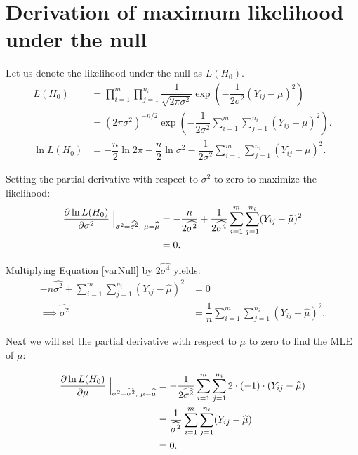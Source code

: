 \documentclass[12pt,a4paper,openright]{article}
\newcommand{\eqn}[1]{Equation \ref{#1}}
\newcommand{\wmu}{\widehat{\mu}}
\newcommand{\wst}{\widehat{\sigma^2}}
\begin{document}
	\section{Derivation of maximum likelihood under the null}
	Let us denote the likelihood under the null as $L(H_0)$. 
	\begin{align}
		L(H_0) &= \prod_{i=1}^m \prod_{j=1}^{n_i} \dfrac{1}{\sqrt{2\pi \sigma^2}} \exp{\left(-\dfrac{1}{2\sigma^2} (Y_{ij}-\mu)^2\right)} \nonumber\\
		&= (2\pi \sigma^2)^{-n/2}\exp{\left(-\dfrac{1}{2\sigma^2} \sum_{i=1}^m \sum_{j=1}^{n_i} (Y_{ij}-\mu)^2\right)}. \label{LH0}\\
		\ln{L(H_0)} &= -\dfrac{n}{2} \ln{2\pi} - \dfrac{n}{2}\ln{\sigma^2} - \dfrac{1}{2\sigma^2} \sum_{i=1}^m \sum_{j=1}^{n_i} (Y_{ij}-\mu)^2. \nonumber
	\end{align}

	Setting the partial derivative with respect to $\sigma^2$ to zero to maximize the likelihood:
	\begin{align}
		\dfrac{\partial \ln{L(H_0)}}{\partial \sigma^2} \Bigm\lvert_{\sigma^2=\wst, \hspace{0.1cm}\mu = \wmu} &= -\dfrac{n}{2\wst} + \dfrac{1}{2\widehat{\sigma^4}}\sum_{i=1}^m \sum_{j=1}^{n_i} (Y_{ij}-\wmu)^2 \nonumber\\
		&= 0. \label{varNull}
	\end{align}

	Multiplying \eqn{varNull} by $2\widehat{\sigma^4}$ yields:
	\begin{align}
		-n\wst + \sum_{i=1}^m \sum_{j=1}^{n_i} (Y_{ij}-\wmu)^2 &= 0\nonumber\\
		\implies \wst &= \dfrac{1}{n} \sum_{i=1}^m \sum_{j=1}^{n_i} (Y_{ij}-\hat{\mu})^2. \label{wst0}
	\end{align}

	Next we will set the partial derivative with respect to $\mu$ to zero to find the MLE of $\mu$:
	
	\begin{align}
		\dfrac{\partial \ln{L(H_0)}}{\partial \mu} \Bigm\lvert_{\sigma^2 = \wst, \hspace{0.1cm}\mu=\wmu} &= -\dfrac{1}{2\wst} \sum_{i=1}^m \sum_{j=1}^{n_i} 2\cdot (-1)\cdot (Y_{ij}-\wmu) \nonumber\\
		&= \dfrac{1}{\wst} \sum_{i=1}^m \sum_{j=1}^{n_i} (Y_{ij}-\wmu) \nonumber\\
		&= 0. \label{muNull}
	\end{align}
\end{document}
